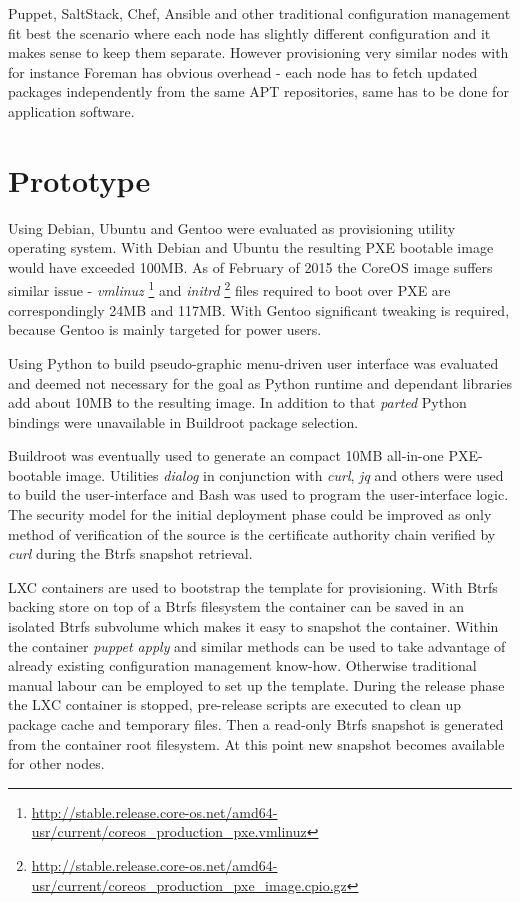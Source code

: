 \documentclass{article}
\begin{document}
Puppet, SaltStack, Chef, Ansible and other traditional configuration management
fit best the scenario where each node has slightly different configuration and
it makes sense to keep them separate. However provisioning very similar nodes
with for instance Foreman has obvious overhead - each node has to fetch updated
packages independently from the same APT repositories, same has to be done for
application software.

\section{Prototype}

Using Debian, Ubuntu and Gentoo were evaluated as provisioning utility
operating system. With Debian and Ubuntu the resulting PXE bootable image
would have exceeded 100MB.
As of February of 2015 the CoreOS image suffers similar issue -
\emph{vmlinuz}
\footnote{\url{http://stable.release.core-os.net/amd64-usr/current/coreos_production_pxe.vmlinuz}}
and
\emph{initrd}
\footnote{\url{http://stable.release.core-os.net/amd64-usr/current/coreos_production_pxe_image.cpio.gz}}
files required to boot over PXE are correspondingly 24MB and 117MB.
With Gentoo significant tweaking is required, because Gentoo is
mainly targeted for power users.

Using Python to build pseudo-graphic menu-driven user interface was
evaluated and deemed not necessary for the goal as Python runtime and
dependant libraries add about 10MB to the resulting image.
In addition to that \emph{parted} Python bindings were unavailable
in Buildroot package selection.

Buildroot was eventually used to generate an compact 10MB all-in-one
PXE-bootable image. Utilities \emph{dialog} in conjunction with
\emph{curl}, \emph{jq} and others were used to build the user-interface
and Bash was used to program the user-interface logic.
The security model for the initial deployment phase could be improved
as only method of verification of the source is the certificate
authority chain verified by \emph{curl} during the Btrfs snapshot
retrieval.

LXC containers are used to bootstrap the template for provisioning.
With Btrfs backing store on top of a Btrfs filesystem the container
can be saved in an isolated Btrfs subvolume which makes it easy to
snapshot the container.
Within the container \emph{puppet apply} and similar methods can be used
to take advantage of already existing configuration management know-how.
Otherwise traditional manual labour can be employed to set up the template.
During the release phase the LXC container is stopped, pre-release scripts
are executed to clean up package cache and temporary files.
Then a read-only Btrfs snapshot is generated from the container root filesystem.
At this point new snapshot becomes available for other nodes.
\end{document}
